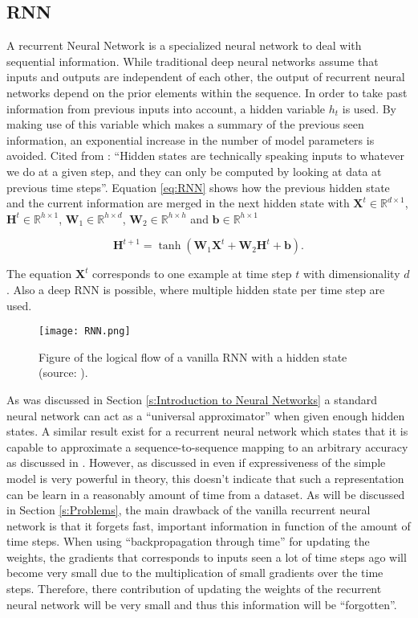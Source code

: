 \subsection{RNN}\label{s:RNN}
A recurrent Neural Network is a specialized neural network to deal with sequential information. While traditional deep neural networks assume that inputs and outputs are independent of each other, the output of recurrent neural networks depend on the prior elements within the sequence. In order to take past information from previous inputs into account, a hidden variable $ h_t $ is used. By making use of this variable which makes a summary of the previous seen information, an exponential increase in the number of model parameters is avoided. Cited from \cite{bibid}: ``Hidden states are technically speaking inputs to whatever we do at a given step, and they can only be computed by looking at data at previous time steps''. Equation \ref{eq:RNN} shows how the previous hidden state and the current information are merged in the next hidden state with $ \textbf{X}^t\in \mathbb{R}^{d\times 1} $, $ \textbf{H}^t\in \mathbb{R}^{h\times 1} $, $ \textbf{W}_1\in \mathbb{R}^{h\times d} $, $\textbf{W}_2\in \mathbb{R}^{h\times h} $ and $ \textbf{b}\in \mathbb{R}^{h\times 1} $ 

\begin{equation}\label{eq:RNN}
	\textbf{H}^{t+1} = \tanh(\textbf{W}_1\textbf{X}^{t}+\textbf{W}_2\textbf{H}^{t}+\textbf{b}).
\end{equation}

The equation $\textbf{X}^t$ corresponds to one example at time step $ t $ with dimensionality $ d $. 
Also a deep RNN is possible, where multiple hidden state per time step are used. \\

\begin{figure}[h]
	\centering
	\texttt{[image: RNN.png]}
	\caption{Figure of the logical flow of a vanilla RNN with a hidden state (source: \cite{Czum2020}).}
	\label{fig:RNN}
\end{figure}

As was discussed in Section \ref{s:Introduction to Neural Networks} a standard neural network can act as a ``universal approximator'' when given enough hidden states. A similar result exist for a recurrent neural network which states that it is capable to approximate a sequence-to-sequence mapping to  an arbitrary accuracy as discussed in \cite{Hammer2000}. However, as discussed in \cite{Teuwen2019} even if expressiveness of the simple model is very powerful in theory, this doesn't indicate that such a representation can be learn in a reasonably amount of time from a dataset. As will be discussed in Section \ref{s:Problems}, the main drawback of the vanilla recurrent neural network is that it forgets fast, important information in function of the amount of time steps. When using ``backpropagation through time'' for updating the weights, the gradients that corresponds to inputs seen a lot of time steps ago will become very small due to the multiplication of small gradients over the time steps. Therefore, there contribution of updating the weights of the recurrent neural network will be very small and thus this information will be ``forgotten''.


